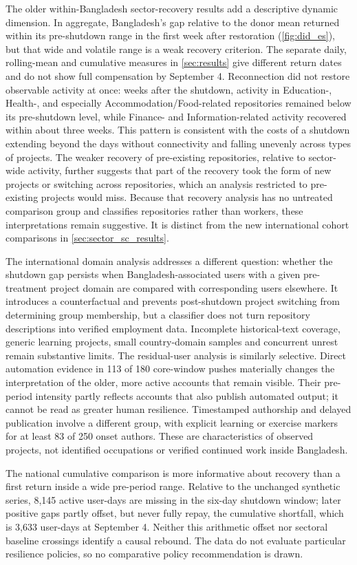 The older within-Bangladesh sector-recovery results add a descriptive dynamic dimension. In aggregate, Bangladesh's gap relative to the donor mean returned within its pre-shutdown range in the first week after restoration (\cref{fig:did_es}), but that wide and volatile range is a weak recovery criterion. The separate daily, rolling-mean and cumulative measures in \cref{sec:results} give different return dates and do not show full compensation by September 4. Reconnection did not restore observable activity at once: weeks after the shutdown, activity in Education-, Health-, and especially Accommodation/Food-related repositories remained below its pre-shutdown level, while Finance- and Information-related activity recovered within about three weeks. This pattern is consistent with the costs of a shutdown extending beyond the days without connectivity and falling unevenly across types of projects. The weaker recovery of pre-existing repositories, relative to sector-wide activity, further suggests that part of the recovery took the form of new projects or switching across repositories, which an analysis restricted to pre-existing projects would miss. Because that recovery analysis has no untreated comparison group and classifies repositories rather than workers, these interpretations remain suggestive. It is distinct from the new international cohort comparisons in \cref{sec:sector_sc_results}.

The international domain analysis addresses a different question: whether the shutdown gap persists when Bangladesh-associated users with a given pre-treatment project domain are compared with corresponding users elsewhere. It introduces a counterfactual and prevents post-shutdown project switching from determining group membership, but a classifier does not turn repository descriptions into verified employment data. Incomplete historical-text coverage, generic learning projects, small country-domain samples and concurrent unrest remain substantive limits. The residual-user analysis is similarly selective. Direct automation evidence in 113 of 180 core-window pushes materially changes the interpretation of the older, more active accounts that remain visible. Their pre-period intensity partly reflects accounts that also publish automated output; it cannot be read as greater human resilience. Timestamped authorship and delayed publication involve a different group, with explicit learning or exercise markers for at least 83 of 250 onset authors. These are characteristics of observed projects, not identified occupations or verified continued work inside Bangladesh.

The national cumulative comparison is more informative about recovery than a first return inside a wide pre-period range. Relative to the unchanged synthetic series, 8,145 active user-days are missing in the six-day shutdown window; later positive gaps partly offset, but never fully repay, the cumulative shortfall, which is 3,633 user-days at September 4. Neither this arithmetic offset nor sectoral baseline crossings identify a causal rebound. The data do not evaluate particular resilience policies, so no comparative policy recommendation is drawn.

